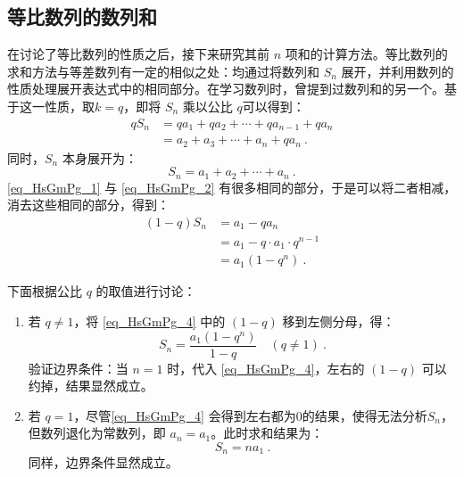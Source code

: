 \subsection{等比数列的数列和}\label{sub_HsGmPg_1}

在讨论了等比数列的性质之后，接下来研究其前 $n$ 项和的计算方法。等比数列的求和方法与等差数列有一定的相似之处：均通过将数列和 $S_n$ 展开，并利用数列的性质处理展开表达式中的相同部分。在学习数列时，曾提到过数列和的另一个。基于这一性质，取$k=q$，即将 $S_n$ 乘以公比 $q$可以得到：
\begin{equation}\label{eq_HsGmPg_1}
\begin{aligned}
qS_n &= qa_1 + qa_2 + \cdots + qa_{n-1} + qa_n\\
&= a_2 + a_3 + \cdots + a_n + qa_n~.
\end{aligned}
\end{equation}
同时，$S_n$ 本身展开为：
\begin{equation}\label{eq_HsGmPg_2}
S_n = a_1 + a_2 + \cdots + a_n~.
\end{equation}
\autoref{eq_HsGmPg_1} 与 \autoref{eq_HsGmPg_2} 有很多相同的部分，于是可以将二者相减，消去这些相同的部分，得到：
\begin{equation}\label{eq_HsGmPg_4}
\begin{aligned}
(1 - q)S_n &= a_1 - qa_n \\
&= a_1 - q\cdot a_1\cdot q^{n-1} \\
&= a_1(1 - q^n)~.
\end{aligned}
\end{equation}

下面根据公比 $q$ 的取值进行讨论：
\begin{enumerate}
\item 若 $q \neq 1$，将 \autoref{eq_HsGmPg_4} 中的 $(1 - q)$ 移到左侧分母，得：
\begin{equation}
S_n = \frac{a_1(1 - q^n)}{1 - q} \quad (q \neq 1)~.
\end{equation}
验证边界条件：当 $n = 1$ 时，代入 \autoref{eq_HsGmPg_4}，左右的 $(1 - q)$ 可以约掉，结果显然成立。
\item 若 $q = 1$，尽管\autoref{eq_HsGmPg_4} 会得到左右都为$0$的结果，使得无法分析$S_n$，但数列退化为常数列，即 $a_n = a_1$。此时求和结果为：
\begin{equation}
S_n = na_1~.
\end{equation}
同样，边界条件显然成立。
\end{enumerate}

